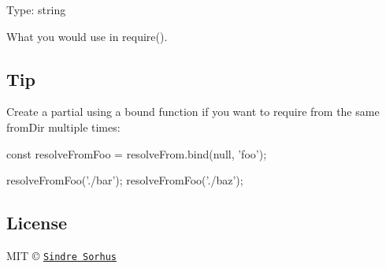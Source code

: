 Type\+: {\ttfamily string}

What you would use in {\ttfamily require()}.

\subsection*{Tip}

Create a partial using a bound function if you want to require from the same {\ttfamily from\+Dir} multiple times\+:


\begin{DoxyCode}
const resolveFromFoo = resolveFrom.bind(null, 'foo');

resolveFromFoo('./bar');
resolveFromFoo('./baz');
\end{DoxyCode}


\subsection*{License}

M\+IT © \href{http://sindresorhus.com}{\tt Sindre Sorhus} 
